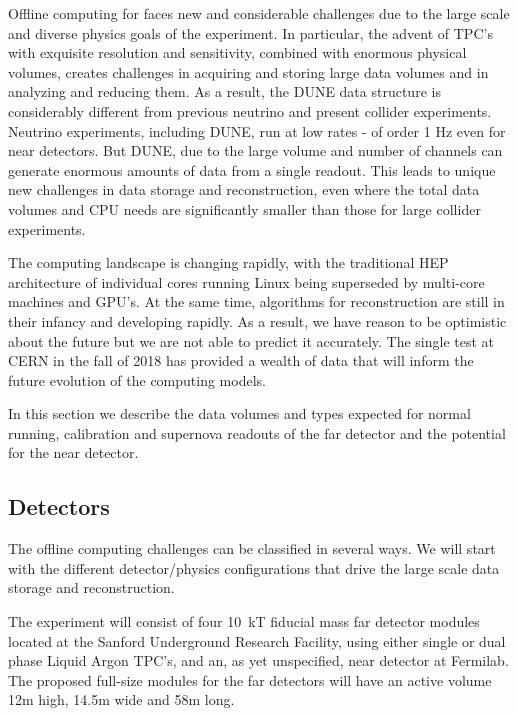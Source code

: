 
Offline computing for   faces new and considerable challenges due to the large scale and diverse physics goals of the experiment.  In particular, the advent of  TPC's with exquisite resolution and sensitivity, combined with enormous physical volumes, creates challenges in acquiring and storing large data volumes and in analyzing and reducing them.  
As a result, the DUNE data structure is considerably different from previous neutrino and present collider experiments. Neutrino experiments, including DUNE, run at low rates - of order 1 Hz even for near detectors. But DUNE, due to the large volume and number of channels can generate enormous amounts of data from a single readout.
This leads to unique new challenges in data storage and reconstruction, even where the total data volumes and CPU needs are significantly smaller than those for large collider experiments.  

The computing landscape is changing rapidly, with the traditional HEP architecture of individual cores running Linux being superseded by multi-core machines and GPU's. At the same time, algorithms for  reconstruction are still in their infancy and developing rapidly.  As a result, we have reason to be optimistic about the future but we are not able to predict it accurately.  The  single test at CERN in the fall of 2018 has provided a wealth of data that will inform the future evolution of  the  computing models.

In this section we describe the data volumes and types expected for normal running, calibration and supernova readouts of the far detector and the potential for the near detector. 



\subsection{Detectors}

The   offline computing challenges can be classified in several ways.  We will start with the different detector/physics configurations that drive the large scale data storage and reconstruction. 

The  experiment will consist of four 10~kT fiducial mass far detector modules located at  the Sanford Underground Research Facility, using either single or dual phase Liquid Argon TPC's, and an, as yet unspecified, near detector at Fermilab.
The proposed  full-size  modules for the far detectors will  have an active volume 12m high, 14.5m wide and 58m long. 

